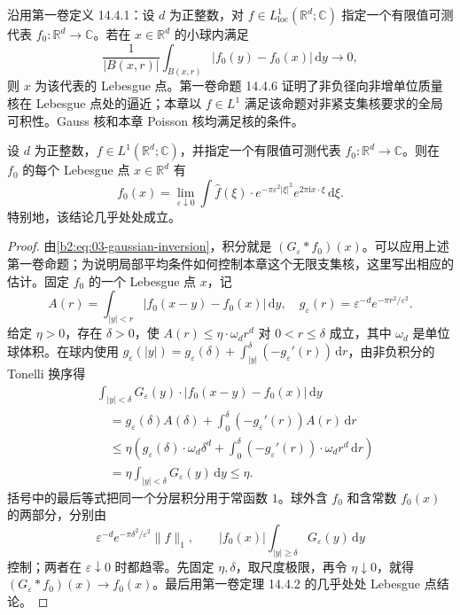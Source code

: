 沿用第一卷定义 14.4.1：设 \(d\) 为正整数，对 \(f\in L^1_{\mathrm{loc}}(\mathbb R^d;\mathbb C)\) 指定一个有限值可测代表 \(f_0\colon\mathbb R^d\to\mathbb C\)。若在 \(x\in\mathbb R^d\) 的小球内满足
\[
 \dfrac1{|B(x,r)|}\int_{B(x,r)}|f_0(y)-f_0(x)|\,\mathrm{d}y\longrightarrow0,
\]
则 \(x\) 为该代表的 Lebesgue 点。第一卷命题 14.4.6 证明了非负径向非增单位质量核在 Lebesgue 点处的逼近；本章以 \(f\in L^1\) 满足该命题对非紧支集核要求的全局可积性。Gauss 核和本章 Poisson 核均满足核的条件。

\begin{corollary}\label{b2:cor:03-pointwise-inversion}
设 \(d\) 为正整数，\(f\in L^1(\mathbb R^d;\mathbb C)\)，并指定一个有限值可测代表 \(f_0\colon\mathbb R^d\to\mathbb C\)。则在 \(f_0\) 的每个 Lebesgue 点 \(x\in\mathbb R^d\) 有
\[
 f_0(x)=\lim_{\varepsilon\downarrow0}
 \int\widehat f(\xi)\cdot e^{-\pi\varepsilon^2|\xi|^2}e^{2\pi\mathrm{i}x\cdot\xi}\,\mathrm{d}\xi.
\]
特别地，该结论几乎处处成立。
\end{corollary}
\begin{proof}
由\eqref{b2:eq:03-gaussian-inversion}，积分就是 \((G_\varepsilon*f_0)(x)\)。可以应用上述第一卷命题；为说明局部平均条件如何控制本章这个无限支集核，这里写出相应的估计。固定 \(f_0\) 的一个 Lebesgue 点 \(x\)，记
\[
 A(r)=\int_{|y|<r}|f_0(x-y)-f_0(x)|\,\mathrm dy,
 \quad g_\varepsilon(r)=\varepsilon^{-d}e^{-\pi r^2/\varepsilon^2}.
\]
给定 \(\eta>0\)，存在 \(\delta>0\)，使 \(A(r)\leq\eta\cdot\omega_dr^d\) 对 \(0<r\leq\delta\) 成立，其中 \(\omega_d\) 是单位球体积。在球内使用
\(g_\varepsilon(|y|)=g_\varepsilon(\delta)+\int_{|y|}^{\delta}(-g_\varepsilon'(r))\,\mathrm dr\)，由非负积分的 Tonelli 换序得
\[
 \begin{aligned}
 &\int_{|y|<\delta}G_\varepsilon(y)\cdot|f_0(x-y)-f_0(x)|\,\mathrm dy\\
 &\quad=g_\varepsilon(\delta)A(\delta)
       +\int_0^\delta(-g_\varepsilon'(r))A(r)\,\mathrm dr\\
 &\quad\leq\eta\left(g_\varepsilon(\delta)\cdot\omega_d\delta^d
       +\int_0^\delta(-g_\varepsilon'(r))\cdot\omega_dr^d\,\mathrm dr\right)\\
 &\quad=\eta\int_{|y|<\delta}G_\varepsilon(y)\,\mathrm dy\leq\eta.
 \end{aligned}
\]
括号中的最后等式把同一个分层积分用于常函数 \(1\)。球外含 \(f_0\) 和含常数 \(f_0(x)\) 的两部分，分别由
\[
 \varepsilon^{-d}e^{-\pi\delta^2/\varepsilon^2}\|f\|_1,
 \qquad |f_0(x)|\int_{|y|\geq\delta}G_\varepsilon(y)\,\mathrm dy
\]
控制；两者在 \(\varepsilon\downarrow0\) 时都趋零。先固定 \(\eta,\delta\)，取尺度极限，再令 \(\eta\downarrow0\)，就得 \((G_\varepsilon*f_0)(x)\to f_0(x)\)。最后用第一卷定理 14.4.2 的几乎处处 Lebesgue 点结论。
\end{proof}

